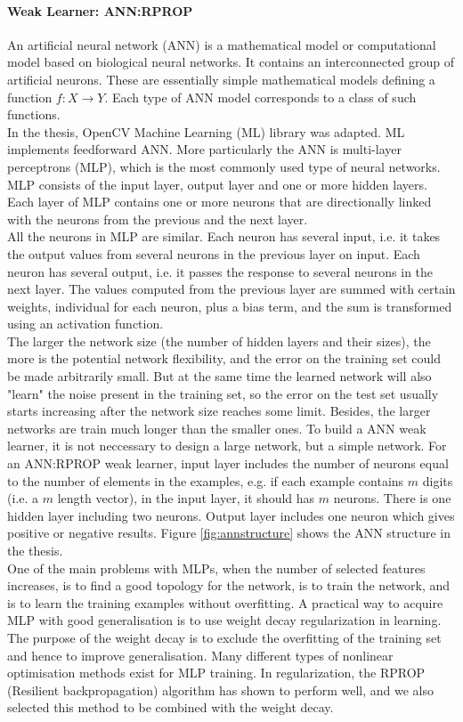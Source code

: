 \paragraph{Weak Learner: ANN:RPROP}
An artificial neural network (ANN) is a mathematical model or computational model based on biological neural networks. It contains an interconnected group of artificial neurons. These are essentially simple mathematical models defining a function $f : X \rightarrow Y$. Each type of ANN model corresponds to a class of such functions.\\
In the thesis, OpenCV Machine Learning (ML) library was adapted. ML implements feedforward ANN. More particularly the ANN is multi-layer perceptrons (MLP), which is the most commonly used type of neural networks. MLP consists of the input layer, output layer and one or more hidden layers. Each layer of MLP contains one or more neurons that are directionally linked with the neurons from the previous and the next layer. \\
All the neurons in MLP are similar. Each neuron has several input, i.e. it takes the output values from several neurons in the previous layer on input. Each neuron has several output, i.e. it passes the response to several neurons in the next layer. The values computed from the previous layer are summed with certain weights, individual for each neuron, plus a bias term, and the sum is transformed using an activation function. \\
The larger the network size (the number of hidden layers and their sizes), the more is the potential network flexibility, and the error on the training set could be made arbitrarily small. But at the same time the learned network will also "learn" the noise present in the training set, so the error on the test set usually starts increasing after the network size reaches some limit. Besides, the larger networks are train much longer than the smaller ones. To build a ANN weak learner, it is not neccessary to design a large network, but a simple network. For an ANN:RPROP weak learner, input layer includes the number of neurons equal to the number of elements in the examples, e.g. if each example contains $m$ digits (i.e. a $m$ length vector), in the input layer, it should has $m$ neurons. There is one hidden layer including two neurons. Output layer includes one neuron which gives positive or negative results. \mbox{Figure} \ref{fig:annstructure} shows the ANN structure in the thesis.\\
One of the main problems with MLPs, when the number of selected features increases, is to find a good topology for the network, is to train the network,  and is to learn the training examples without overfitting.  A practical way to acquire MLP with good generalisation is to use weight decay regularization in learning. The purpose of the weight decay is to exclude the overfitting of the training set and hence to improve generalisation. Many different types of nonlinear optimisation methods exist for MLP training. In regularization, the RPROP (Resilient backpropagation) \cite{Riedmiller1993} algorithm has shown to perform well, and we also selected this method to be combined with the weight decay.\\
